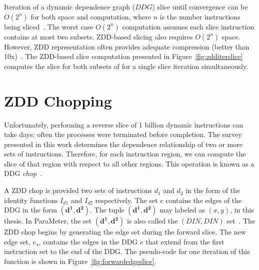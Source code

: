 \documentclass[defaultstyle,11pt]{thesis}
\begin{document}
Iteration of a dynamic dependence graph ($DDG$) slice until
convergence can be $O(2^n)$ for both space and computation, where $n$
is the number instructions being
sliced~\cite{agrawal:90:pldi,tip:94:cwi}.  The worst case $O(2^n)$
computation assumes each slice instruction contains at most two
subsets. ZDD-based slicing also requires $O(2^n)$ space.  However, ZDD
representation often provides adequate compression (better than
10x)~\cite{price:10:cgo}. The ZDD-based slice computation presented in
Figure~\ref{fig:zdditerslice} computes the slice for both subsets of
for a single slice iteration simultaneously. 




\section{ZDD Chopping}
\label{sec:chop}

Unfortunately, performing a reverse slice of 1 billion dynamic
instructions can take days; often the processes were terminated before
completion. The survey presented in this work determines the
dependence relationship of two or more sets of instructions.
Therefore, for each instruction region, we can compute the slice of
that region with respect to all other regions.  This operation is
known as a DDG \textit{chop}~\cite{gupta:2005:ase, krinke:2004:sqc}.

A ZDD chop is provided two sets of instructions $d_{1}$ and $d_{2}$ in
the form of the identity functions $I_{d1}$ and $I_{d2}$ respectively.
The set $e$ contains the edges of the DDG in the form
$(\mathbf{d^1},\mathbf{d^2})$. The tuple $(\mathbf{d^1},\mathbf{d^2})$
may labeled as $(x,y)$, in this thesis.  In ParaMeter, the set
$(\mathbf{d^1},\mathbf{d^2})$ is also called the $(DIN,DIN)$
set~\cite{price:08:pact}. The ZDD chop begins by generating the edge
set during the forward slice.  The new edge set, $e_s$, contains the
edges in the DDG $e$ that extend from the first instruction set to the
end of the DDG.  The pseudo-code for one iteration of this function is
shown in Figure~\ref{fig:forwardedgeslice}.
\end{document}
